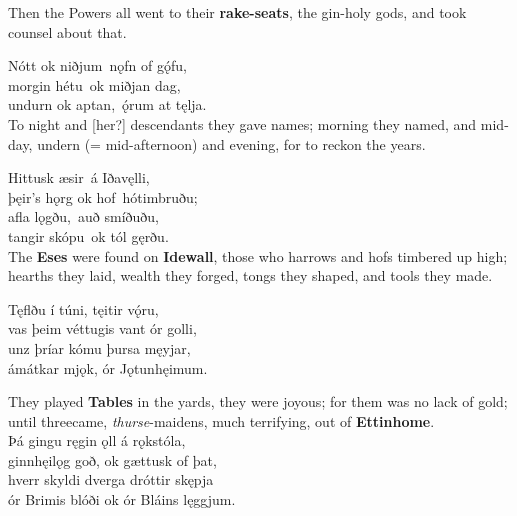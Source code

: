 \bvb Then the Powers all went to their \textbf{rake-seats}, the gin-holy gods, and took counsel about that.

\bva Nótt ok niðjum \hld nǫfn of gǫ́fu, \\%
morgin hétu \hld ok miðjan dag, \\%
undurn ok aptan, \hld ǫ́rum at tęlja.\footnotemark[22]
\\%

\bvb To night and [her?] descendants they gave names; morning they named, and mid-day, undern (= mid-afternoon) and evening, for to reckon the years.

\bva Hittusk æsir \hld á Iðavęlli, \\%
þęir's hǫrg ok hof \hld hótimbruðu; \\%
afla lǫgðu, \hld auð smíðuðu, \\%
tangir skópu \hld ok tól gęrðu.\\%

\bvb The \textbf{Eses} were found on \textbf{Idewall}, those who harrows and hofs timbered up high; hearths they laid, wealth they forged, tongs they shaped, and tools they made. 

\bva Tęflðu í túni, \hld tęitir vǫ́ru, \\%
vas þeim véttugis \hld vant ór golli, \\%
unz þríar kómu \hld þursa męyjar, \\%
ámátkar mjǫk, \hld ór Jǫtunhęimum.

\bvb They played \textbf{Tables} in the yards, they were joyous; for them was no lack of gold; until three\footnotemark[21] came, \emph{thurse}-maidens, much terrifying, out of \textbf{Ettinhome}.
\\%

\bva Þá gingu ręgin ǫll \hld á rǫkstóla, \\%
ginnhęilǫg goð, \hld ok gættusk of þat, \\%
hverr skyldi dverga \hld dróttir skępja \\%
ór Brimis blóði \hld ok ór Bláins lęggjum.\footnotemark[22]
\\%

